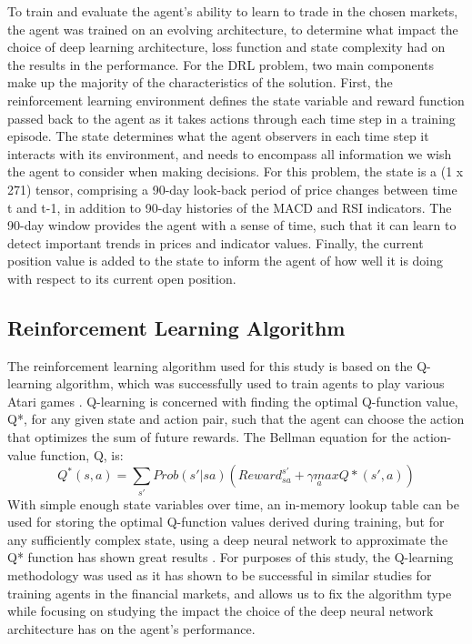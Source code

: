 \documentclass[10pt,twocolumn,letterpaper]{article}
\begin{document}
To train and evaluate the agent's ability to learn to trade in the chosen markets, the agent was trained on an evolving architecture, to determine what impact the choice of deep learning architecture, loss function and state complexity had on the results in the performance. For the DRL problem, two main components make up the majority of the characteristics of the solution. First, the reinforcement learning environment defines the state variable and reward function passed back to the agent as it takes actions through each time step in a training episode. The state determines what the agent observers in each time step it interacts with its environment, and needs to encompass all information we wish the agent to consider when making decisions. For this problem, the state is a (1 x 271) tensor, comprising a 90-day look-back period of price changes between time t and t-1, in addition to 90-day histories of the MACD and RSI indicators. The 90-day window provides the agent with a sense of time, such that it can learn to detect important trends in prices and indicator values. Finally, the current position value is added to the state to inform the agent of how well it is doing with respect to its current open position.

\subsection{Reinforcement Learning Algorithm}
The reinforcement learning algorithm used for this study is based on the Q-learning algorithm, which was successfully used to train agents to play various Atari games \cite{playingatari}. Q-learning is concerned with finding the optimal Q-function value, Q*, for any given state and action pair, such that the agent can choose the action that optimizes the sum of future rewards. The Bellman equation for the action-value function, Q, is:
\begin{equation}
Q^*(s,a) = \sum_{s'}Prob(s'|sa) ( Reward^{s'}_{sa} + \gamma  \underset{a}max  Q*(s',a))
\end{equation}
With simple enough state variables over time, an in-memory lookup table can be used for storing the optimal Q-function values derived during training, but for any sufficiently complex state, using a deep neural network to approximate the Q* function has shown great results \cite{playingatari}. For purposes of this study, the Q-learning methodology was used as it has shown to be successful in similar studies for training agents in the financial markets\cite{deep}, and allows us to fix the algorithm type while focusing on studying the impact the choice of the deep neural network architecture has on the agent's performance.
\end{document}
